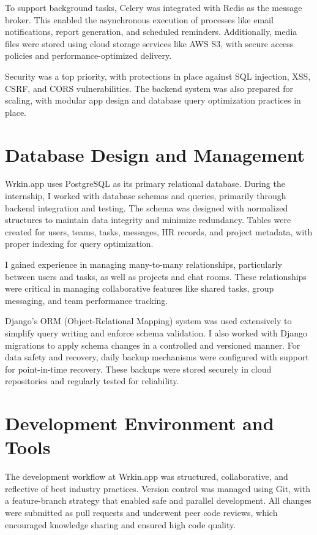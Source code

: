 To support background tasks, Celery was integrated with Redis as the message broker. This enabled the asynchronous execution of processes like email notifications, report generation, and scheduled reminders. Additionally, media files were stored using cloud storage services like AWS S3, with secure access policies and performance-optimized delivery.

Security was a top priority, with protections in place against SQL injection, XSS, CSRF, and CORS vulnerabilities. The backend system was also prepared for scaling, with modular app design and database query optimization practices in place.

\section{Database Design and Management}

Wrkin.app uses PostgreSQL as its primary relational database. During the internship, I worked with database schemas and queries, primarily through backend integration and testing. The schema was designed with normalized structures to maintain data integrity and minimize redundancy. Tables were created for users, teams, tasks, messages, HR records, and project metadata, with proper indexing for query optimization.

I gained experience in managing many-to-many relationships, particularly between users and tasks, as well as projects and chat rooms. These relationships were critical in managing collaborative features like shared tasks, group messaging, and team performance tracking.

Django’s ORM (Object-Relational Mapping) system was used extensively to simplify query writing and enforce schema validation. I also worked with Django migrations to apply schema changes in a controlled and versioned manner. For data safety and recovery, daily backup mechanisms were configured with support for point-in-time recovery. These backups were stored securely in cloud repositories and regularly tested for reliability.

\section{Development Environment and Tools}

The development workflow at Wrkin.app was structured, collaborative, and reflective of best industry practices. Version control was managed using Git, with a feature-branch strategy that enabled safe and parallel development. All changes were submitted as pull requests and underwent peer code reviews, which encouraged knowledge sharing and ensured high code quality.

